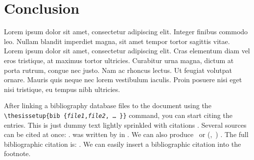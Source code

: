 \documentclass[
  digital,     %
  oneside,     %
  nosansbold,  %
  nocolorbold, %
  lof,         %
  lot,         %
]{fithesis4}
\begin{document}
\chapter*{Conclusion}
\shorthandoff{-}
Lorem ipsum dolor sit amet, consectetur adipiscing elit. Integer finibus commodo leo. Nullam blandit imperdiet magna, sit amet tempor tortor sagittis vitae. Lorem ipsum dolor sit amet, consectetur adipiscing elit. Cras elementum diam vel eros tristique, at maximus tortor ultricies. Curabitur urna magna, dictum at porta rutrum, congue nec justo. Nam ac rhoncus lectus. Ut feugiat volutpat ornare. Mauris quis neque nec lorem vestibulum iaculis. Proin posuere nisi eget nisi tristique, eu tempus nibh ultricies.
\shorthandon{-}

After linking a bibliography data\-base files to the document using
the \verb"\"\texttt{thesis\discretionary{-}{}{}setup\{bib\discretionary{=}{=}{=}%
\{\textit{file1},\textit{file2},\,\ldots\,\}\}} command, you can
start citing the entries. This is just dummy text
\parencite{borgman03} lightly sprinkled with citations
\parencite[p.~123]{greenberg98}. Several sources can be cited at
once: \cite{borgman03,greenberg98,thanh01}.
 was written by \citeauthor{greenberg98} in
\citeyear{greenberg98}. We can also produce \textcite{greenberg98}%
\ or %
\def\citeauthoryear#1{(\textcite{#1},~\citeyear{#1})}%
\citeauthoryear{greenberg98}%
. The full bibliographic citation is:
\emph{}. We can easily insert a bibliographic
citation into the footnote.

\printbibliography[heading=bibintoc]
\end{document}
